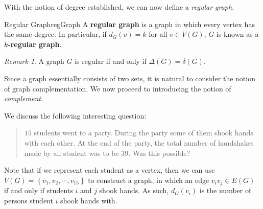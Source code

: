 \documentclass[math]{amznotes}
\makeatletter
\let\save@mathaccent\mathaccent
\newcommand*\if@single[3]{%
  \setbox0\hbox{${\mathaccent"0362{#1}}^H$}%
  \setbox2\hbox{${\mathaccent"0362{\kern0pt#1}}^H$}%
  \ifdim\ht0=\ht2 #3\else #2\fi
  }
\newcommand*\rel@kern[1]{\kern#1\dimexpr\macc@kerna}
\newcommand*\widebar[1]{\@ifnextchar^{{\wide@bar{#1}{0}}}{\wide@bar{#1}{1}}}
\newcommand*\wide@bar[2]{\if@single{#1}{\wide@bar@{#1}{#2}{1}}{\wide@bar@{#1}{#2}{2}}}
\newcommand*\wide@bar@[3]{%
  \begingroup
  \def\mathaccent##1##2{%
    \let\mathaccent\save@mathaccent
    \if#32 \let\macc@nucleus\first@char \fi
    \setbox\z@\hbox{$\macc@style{\macc@nucleus}_{}$}%
    \setbox\tw@\hbox{$\macc@style{\macc@nucleus}{}_{}$}%
    \dimen@\wd\tw@
    \advance\dimen@-\wd\z@
    \divide\dimen@ 3
    \@tempdima\wd\tw@
    \advance\@tempdima-\scriptspace
    \divide\@tempdima 10
    \advance\dimen@-\@tempdima
    \ifdim\dimen@>\z@ \dimen@0pt\fi
    \rel@kern{0.6}\kern-\dimen@
    \if#31
      \overline{\rel@kern{-0.6}\kern\dimen@\macc@nucleus\rel@kern{0.4}\kern\dimen@}%
      \advance\dimen@0.4\dimexpr\macc@kerna
      \let\final@kern#2%
      \ifdim\dimen@<\z@ \let\final@kern1\fi
      \if\final@kern1 \kern-\dimen@\fi
    \else
      \overline{\rel@kern{-0.6}\kern\dimen@#1}%
    \fi
  }%
  \macc@depth\@ne
  \let\math@bgroup\@empty \let\math@egroup\macc@set@skewchar
  \mathsurround\z@ \frozen@everymath{\mathgroup\macc@group\relax}%
  \macc@set@skewchar\relax
  \let\mathaccentV\macc@nested@a
  \if#31
    \macc@nested@a\relax111{#1}%
  \else
    \def\gobble@till@marker##1\endmarker{}%
    \futurelet\first@char\gobble@till@marker#1\endmarker
    \ifcat\noexpand\first@char A\else
      \def\first@char{}%
    \fi
    \macc@nested@a\relax111{\first@char}%
  \fi
  \endgroup
}
\theoremstyle{remark}
\newtheorem*{remark}{Remark}
\makeatother
\begin{document}
With the notion of degree established, we can now define a \textit{regular graph}.
\begin{dfnbox}{Regular Graph}{regGraph}
    A {\color{red} \textbf{regular graph}} is a graph in which every vertex has the same degree. In particular, if $d_G(v) = k$ for all $v \in V(G)$, $G$ is known as a {\color{red} \textbf{$k$-regular graph}}.
\end{dfnbox}
\begin{notebox}
    \begin{remark}
        A graph $G$ is regular if and only if $\Delta(G) = \delta(G)$.
    \end{remark}
\end{notebox}
Since a graph essentially consists of two sets, it is natural to consider the notion of graph complementation. We now proceed to introducing the notion of \textit{complement}.
We discuss the following interesting question:
\begin{quote}
    $15$ students went to a party. During the party some of them shook hands with each other. At the end of the party, the total number of handshakes made by all student was to be $39$. Was this possible?
\end{quote}
Note that if we represent each student as a vertex, then we can use $V(G) = \left\{v_1, v_2, \cdots, v_{15}\right\}$ to construct a graph, in which an edge $v_iv_j \in E(G)$ if and only if students $i$ and $j$ shook hands. As such, $d_G(v_i)$ is the number of persons student $i$ shook hands with.
\end{document}
